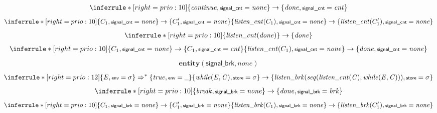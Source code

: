 \documentclass{article}
\begin{document}
\begin{gather}
\inferrule*[right = \scriptsize prio:10]{}{\{ \mathit{continue} , \textsf{signal\_cnt} = \mathit{none} \} \rightarrow \{ \mathit{done} , \textsf{signal\_cnt} = \mathit{cnt} \}}
\end{gather}
\begin{gather}
\inferrule*[right = \scriptsize prio:10]{\{ C_1 , \textsf{signal\_cnt} = \mathit{none} \} \rightarrow \{ C_1' , \textsf{signal\_cnt} = \mathit{none} \}}{\{ \mathit{listen\_cnt}(C_1) , \textsf{signal\_cnt} = \mathit{none} \} \rightarrow \{ \mathit{listen\_cnt}(C_1') , \textsf{signal\_cnt} = \mathit{none} \}}
\end{gather}
\begin{gather}
\inferrule*[right = \scriptsize prio:10]{}{\{\mathit{listen\_cnt}(\mathit{done})\} \rightarrow \{\mathit{done}\}}
\end{gather}
\begin{gather}
\inferrule*[right = \scriptsize prio:10]{\{ C_1 , \textsf{signal\_cnt} = \mathit{none} \} \rightarrow \{ C_1 , \textsf{signal\_cnt} = \mathit{cnt} \}}{\{ \mathit{listen\_cnt}(C_1) , \textsf{signal\_cnt} = \mathit{none} \} \rightarrow \{ \mathit{done} , \textsf{signal\_cnt} = \mathit{none} \}}
\end{gather}
\begin{gather}
\textbf{entity}(\textsf{signal\_brk},\mathit{none})
\end{gather}
\begin{gather}
\inferrule*[right = \scriptsize prio:12]{\{ \mathit{E} , \textsf{env} = \sigma \} \Rightarrow^* \{ \mathit{true} , \textsf{env} = \_ \}}{\{ \mathit{while}(\mathit{E},\mathit{C}) , \textsf{store} = \sigma \} \rightarrow \{ \mathit{listen\_brk}(\mathit{seq}(\mathit{listen\_cnt}(\mathit{C}),\mathit{while}(\mathit{E},\mathit{C}))) , \textsf{store} = \sigma \}}
\end{gather}
\begin{gather}
\inferrule*[right = \scriptsize prio:10]{}{\{ \mathit{break} , \textsf{signal\_brk} = \mathit{none} \} \rightarrow \{ \mathit{done} , \textsf{signal\_brk} = \mathit{brk} \}}
\end{gather}
\begin{gather}
\inferrule*[right = \scriptsize prio:10]{\{ C_1 , \textsf{signal\_brk} = \mathit{none} \} \rightarrow \{ C_1' , \textsf{signal\_brk} = \mathit{none} \}}{\{ \mathit{listen\_brk}(C_1) , \textsf{signal\_brk} = \mathit{none} \} \rightarrow \{ \mathit{listen\_brk}(C_1') , \textsf{signal\_brk} = \mathit{none} \}}
\end{gather}
\end{document}
